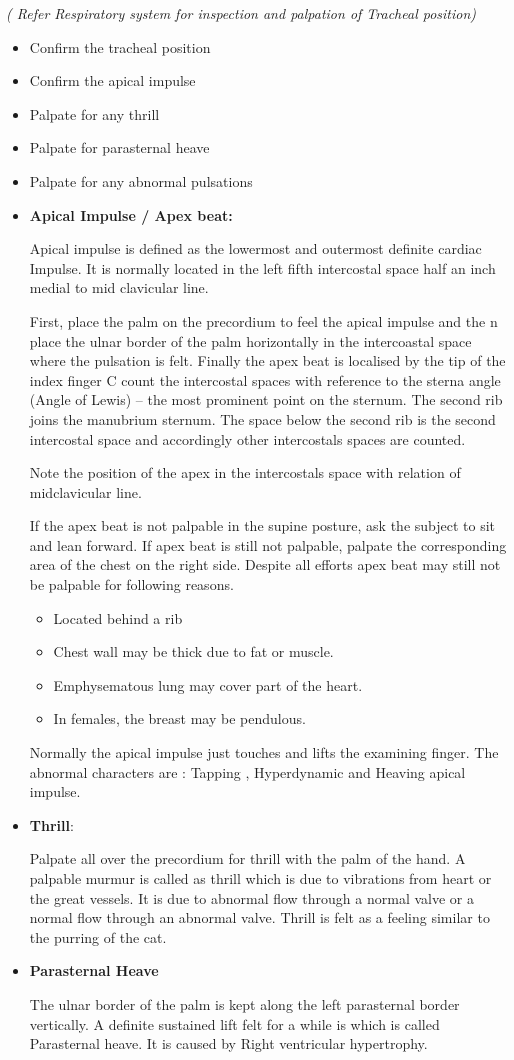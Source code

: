 \documentclass[a4paper,12pt,openany,oneside]{book}
\begin{document}
\emph{( Refer Respiratory system for inspection and palpation of Tracheal position)}
\begin{itemize}
\item{Confirm the tracheal position}
\item{Confirm the apical impulse}
\item{Palpate for any thrill}
\item{Palpate for parasternal heave}
\item{Palpate for any abnormal pulsations}
\item{\textbf{Apical Impulse / Apex beat:}
	\par
	Apical impulse is defined as the lowermost and outermost definite cardiac Impulse. It is normally located in the left fifth intercostal space half an inch medial to mid clavicular line.
	\par
	First, place the palm on the precordium to feel the apical impulse and the n place the ulnar border of the palm horizontally in the intercoastal space where the pulsation is felt. Finally the apex beat is localised by the tip of the index finger C count the intercostal spaces with reference to the sterna angle (Angle of Lewis) – the most prominent point on the sternum. The second rib joins the manubrium sternum. The space below the second rib is the second intercostal space and accordingly other intercostals spaces are counted. 
	\par
	Note the position of the apex in the intercostals space with relation of midclavicular line.
	\par
	If the apex beat is not palpable in the supine posture, ask the subject to sit and lean forward. If apex beat is still not palpable, palpate the corresponding area of the chest on the right side. Despite all efforts apex beat may still not be palpable for following reasons.
	\begin{itemize}
\item{ Located behind a rib}
\item{ Chest wall may be thick due to fat or muscle.}
\item{ Emphysematous lung may cover part of the heart.}
\item{ In females, the breast may be pendulous.}
	\end{itemize}
	\par
	Normally the apical impulse just touches and lifts the examining finger. The abnormal characters are : Tapping , Hyperdynamic and Heaving apical impulse.
	}
\item{\textbf{Thrill}:
	\par
	Palpate all over the precordium for thrill with the palm of the hand. A palpable murmur is called as thrill which is due to vibrations from heart or the great vessels. It is due to abnormal flow through a normal valve or a normal flow through an abnormal valve. Thrill is felt as a feeling similar to the purring of the cat.
	}										    
\item{\textbf{Parasternal Heave}
	\par
The ulnar border of the palm is kept along the left parasternal border vertically. A definite sustained lift felt for a while is which is called Parasternal heave. It is caused by Right ventricular hypertrophy.
}
\end{itemize}
\end{document}
